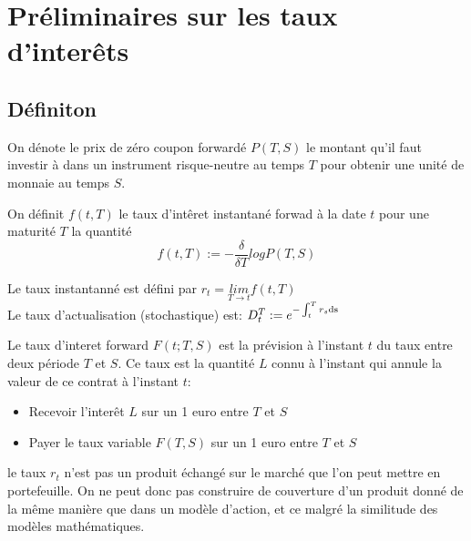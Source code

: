 

\chapter{Préliminaires sur les taux d'interêts}

\section{Définiton}
\begin{defn}
On dénote le prix de zéro coupon forwardé $P(T, S)$ le montant qu'il faut investir à dans un instrument risque-neutre au temps $T$ pour obtenir une unité de monnaie au temps $S$.
\end{defn}

\begin{defn}
On définit $f(t, T)$ le taux d'intêret instantané forwad à la date $t$ pour une maturité $T$ la quantité $$f(t, T) := - \frac{ \delta}{\delta T}  log P(T, S)$$
\end{defn}

\begin{defn} Le taux instantanné est défini par
  $r_t = \underset{T \to t}{lim}f(t, T) $ \\
  Le taux d'actualisation (stochastique) est: $D_t^T := e^{-\int_t^Tr_s \rm{d}s}$
\end{defn}

\iffalse
\begin{defn}
  Le taux d'interet cumulé entre deux période $t$ et $T$ est la quantité $R(t, T)$ que $r_t$ doit égaler spour avoir le même rendement
\end{defn}
\fi

\begin{defn}
  Le taux d'interet forward $F(t; T, S)$ est la prévision  à l'instant $t$ du taux entre deux période $T$ et $S$.
  Ce taux est la quantité $L$ connu à l'instant qui annule la valeur de ce contrat à l'instant $t$:
  \begin{itemize}
  \item Recevoir l'interêt  $L$ sur un 1 euro entre $T$ et $S$
  \item Payer le taux variable  $F(T, S)$ sur un 1 euro entre $T$ et $S$
  \end{itemize}
\end{defn}


le taux $r_t$ n’est pas un produit échangé sur le marché que l’on peut mettre en portefeuille. On ne peut donc pas construire de couverture d’un produit donné de la même manière que dans un modèle d’action, et ce malgré la similitude des modèles mathématiques.

